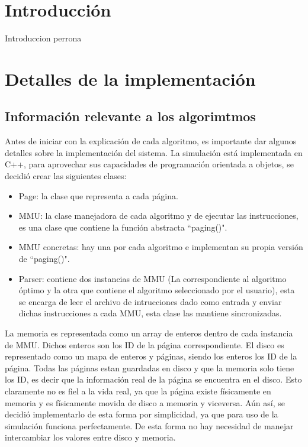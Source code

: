 \documentclass{report}
\begin{document}


\tableofcontents

\chapter{Introducción}\label{intro}
Introduccion perrona

\chapter{Detalles de la implementación}
\section {Información relevante a los algorimtmos}
Antes de iniciar con la explicación de cada algoritmo, es importante dar algunos detalles sobre la implementación del sistema. 
La simulación está implementada en C++, para aprovechar sus capacidades de programación orientada a objetos, se decidió crear las siguientes clases:

\begin{itemize}
    \item Page: la clase que representa a cada página.
    \item MMU: la clase manejadora de cada algoritmo y de ejecutar las instrucciones, es una clase que contiene la función  abstracta ``paging()".
    \item MMU concretas: hay una por cada algoritmo e implementan su propia versión de ``paging()".
    \item Parser: contiene dos instancias de MMU (La correspondiente al algoritmo óptimo y la otra que contiene el algoritmo seleccionado por el usuario), esta se encarga de leer el archivo de intrucciones dado como entrada y enviar dichas instrucciones a cada MMU, esta clase las mantiene sincronizadas. 
\end{itemize}

La memoria es representada como un array de enteros dentro de cada instancia de MMU. 
Dichos enteros son los ID de la página correspondiente. 
El disco es representado como un mapa de enteros y páginas, siendo los enteros los ID de la página.
Todas las páginas estan guardadas en disco y que la memoria solo tiene los ID, es decir que la información real de la página se encuentra en el disco.
Esto claramente no es fiel a la vida real, ya que la página existe físicamente en memoria y es físicamente movida de disco a memoria y viceversa.
Aún así, se decidió implementarlo de esta forma por simplicidad, ya que para uso de la simulación funciona perfectamente.
De esta forma no hay necesidad de manejar intercambiar los valores entre disco y memoria.
\end{document}
